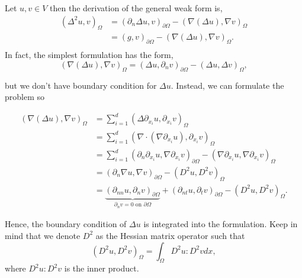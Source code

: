 Let $u,v \in  V$ then the derivation of the general weak form is,
\[
\begin{split}
\left( \Delta ^2 u,v \right) _{\Omega }  &  = \left( \partial _{n} \Delta u, v \right) _{\partial \Omega } - \left( \nabla \left( \Delta  u \right) , \nabla v \right) _{\Omega }  \\
 & = \left( g, v \right) _{\partial \Omega } - \left( \nabla \left( \Delta u \right) , \nabla v \right) _{\Omega }. \\
\end{split}
\]
In fact, the simplest formulation has the form,
\[
  \left( \nabla \left( \Delta u \right) , \nabla v \right) _{\Omega } =   \left( \Delta u, \partial _{n} v \right) _{\partial \Omega } - \left( \Delta u, \Delta v \right)_{\Omega },
\]

but we don't have boundary condition for $\Delta u$.  Instead, we can formulate the problem so

\begin{align*}
\left( \nabla \left( \Delta u \right) , \nabla v \right) _{\Omega } & = \sum_{i = 1}^{ d}  \left( \Delta  \partial _{x_{i}} u, \partial _{x_{i}}v \right) _{\Omega }  \\
&= \sum_{i = 1}^{d}  \left( \nabla \cdot \left( \nabla \partial _{x_{i}} u \right) , \partial _{x_{i}} v \right)_{\Omega }  \\
&= \sum_{i = 1}^{d}  \left( \partial_n  \partial _{x_{i}} u, \nabla  \partial _{x_{i}} v \right) _{\partial \Omega} -   \left( \nabla \partial _{x_{i}} u, \nabla \partial _{x_{i}} v \right)_{\Omega }  \\
&= \left(  \partial_n\nabla u, \nabla v \right) _{\partial \Omega } - \left( D^2 u, D^2v \right) _{\Omega } \\
&= \underbrace{\left( \partial _{nn} u, \partial _{n} v  \right)_{\partial \Omega }}_{\partial _n v =0 \text{ on } \partial \Omega  }   + \left( \partial _{nt} u, \partial _{t} v \right) _{\partial \Omega } - \left( D^2u, D^2v \right) _{\Omega } .
\end{align*}

Hence, the boundary condition of $\Delta u$ is integrated into the formulation. Keep in mind that we denote $D^2$ as the Hessian matrix operator such that
$$( D^2u, D^2v )_{\Omega } = \int_{\Omega }^{} D^{2}u : D^2v  dx,$$
where $D^2u:D^2v$ is the inner product.

